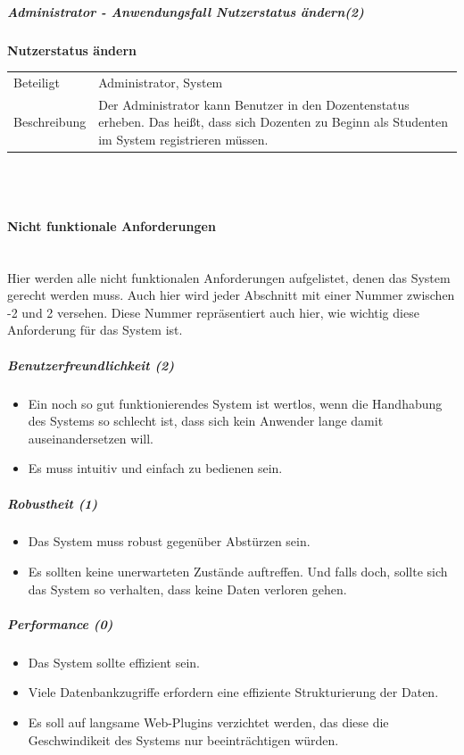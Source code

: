 \documentclass[12pt,a4paper]{article}
\begin{document}
{\subparagraph{Administrator - Anwendungsfall \glqq Nutzerstatus ändern\grqq (2)}\mbox{}

\textbf{Nutzerstatus ändern}\\
\begin{tabular}{l|p{12cm}}
\hline 
Beteiligt & Administrator, System \\ 
Beschreibung & Der Administrator kann Benutzer in den Dozentenstatus erheben. Das heißt, dass sich Dozenten zu Beginn als Studenten im System registrieren müssen. \\ 
\end{tabular}\\\\ 

\paragraph{Nicht funktionale Anforderungen}\mbox{}\\
Hier werden alle nicht funktionalen Anforderungen aufgelistet, denen das System gerecht werden muss. Auch hier wird jeder Abschnitt mit einer Nummer zwischen -2 und 2 versehen. Diese Nummer repräsentiert auch hier, wie wichtig diese Anforderung für das System ist.
\subparagraph{Benutzerfreundlichkeit (2)}
\begin{itemize}
\item Ein noch so gut funktionierendes System ist wertlos, wenn die Handhabung des Systems so schlecht ist, dass sich kein Anwender lange damit auseinandersetzen will. 
\item Es muss intuitiv und einfach zu bedienen sein.
\end{itemize}
\subparagraph{Robustheit (1)}
\begin{itemize}
\item Das System muss robust gegenüber Abstürzen sein. 
\item Es sollten keine unerwarteten Zustände auftreffen. Und falls doch, sollte sich das System so verhalten, dass keine Daten verloren gehen.
\end{itemize}
\subparagraph{Performance (0)}
\begin{itemize}
\item Das System sollte effizient sein.
\item Viele Datenbankzugriffe erfordern eine effiziente Strukturierung der Daten.
\item Es soll auf langsame Web-Plugins verzichtet werden, das diese die Geschwindikeit des Systems nur beeinträchtigen würden. 
\end{itemize}
}
\end{document}
